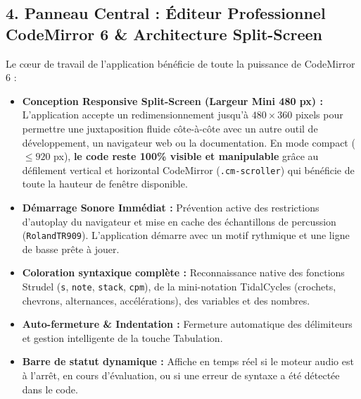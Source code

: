 \documentclass[a4paper,10pt]{article}
\begin{document}
\subsection{4. Panneau Central : Éditeur Professionnel CodeMirror 6 \& Architecture Split-Screen}
Le cœur de travail de l'application bénéficie de toute la puissance de CodeMirror 6 :
\begin{itemize}
    \item \textbf{Conception Responsive Split-Screen (Largeur Mini 480 px) :}
    L'application accepte un redimensionnement jusqu'à $480 \times 360$ pixels pour permettre une juxtaposition fluide côte-à-côte avec un autre outil de développement, un navigateur web ou la documentation.
    En mode compact ($\le 920$ px), \textbf{le code reste 100\% visible et manipulable} grâce au défilement vertical et horizontal CodeMirror (\texttt{.cm-scroller}) qui bénéficie de toute la hauteur de fenêtre disponible.
    \item \textbf{Démarrage Sonore Immédiat :} Prévention active des restrictions d'autoplay du navigateur et mise en cache des échantillons de percussion (\texttt{RolandTR909}). L'application démarre avec un motif rythmique et une ligne de basse prête à jouer.
    \item \textbf{Coloration syntaxique complète :} Reconnaissance native des fonctions Strudel (\texttt{s}, \texttt{note}, \texttt{stack}, \texttt{cpm}), de la mini-notation TidalCycles (crochets, chevrons, alternances, accélérations), des variables et des nombres.
    \item \textbf{Auto-fermeture \& Indentation :} Fermeture automatique des délimiteurs et gestion intelligente de la touche Tabulation.
    \item \textbf{Barre de statut dynamique :} Affiche en temps réel si le moteur audio est à l'arrêt, en cours d'évaluation, ou si une erreur de syntaxe a été détectée dans le code.
\end{itemize}
\end{document}

